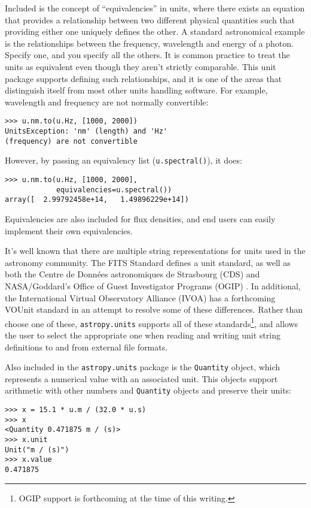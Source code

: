 \documentclass[traditabstract]{aa}
\begin{document}
Included is the concept of ``equivalencies'' in units, where there
exists an equation that provides a relationship between two different
physical quantities such that providing either one uniquely defines
the other.  A standard astronomical example is the relationships
between the frequency, wavelength and energy of a photon.  Specify
one, and you specify all the others. It is common practice to treat
the units as equivalent even though they aren't strictly comparable.
This unit package supports defining such relationships, and it is one
of the areas that distinguish itself from most other units handling
software.  For example, wavelength and frequency are not normally
convertible:
\begin{verbatim}
>>> u.nm.to(u.Hz, [1000, 2000])
UnitsException: 'nm' (length) and 'Hz'
(frequency) are not convertible
\end{verbatim}
However, by passing an equivalency list (\texttt{u.spectral()}), it
does:
\begin{verbatim}
>>> u.nm.to(u.Hz, [1000, 2000],
            equivalencies=u.spectral())
array([  2.99792458e+14,   1.49896229e+14])
\end{verbatim}
Equivalencies are also included for flux densities, and end users can
easily implement their own equivalencies.


It's well known that there are multiple string representations for
units used in the astronomy community.  The FITS Standard
\cite{fits2008} defines a unit standard, as well as both the Centre de
Donn\'ees astronomiques de Strasbourg (CDS) \citep{ochsenbein2000cds}
and NASA/Goddard's Office of Guest Investigator Programs (OGIP)
\citep{george1995ogip}.  In additional, the International Virtual
Observatory Alliance (IVOA) has a forthcoming VOUnit standard
\citep{derriere2012vounit} in an attempt to resolve some of these
differences.  Rather than choose one of these, \texttt{astropy.units}
supports all of these standards\footnote{OGIP support is forthcoming
  at the time of this writing.}, and allows the user to select the
appropriate one when reading and writing unit string definitions to
and from external file formats.

Also included in the \texttt{astropy.units} package is the
\texttt{Quantity} object, which represents a numerical value with an
associated unit.  This objects support arithmetic with other numbers
and \texttt{Quantity} objects and preserve their units:
\begin{verbatim}
>>> x = 15.1 * u.m / (32.0 * u.s)
>>> x
<Quantity 0.471875 m / (s)>
>>> x.unit
Unit("m / (s)")
>>> x.value
0.471875
\end{verbatim}
\end{document}
